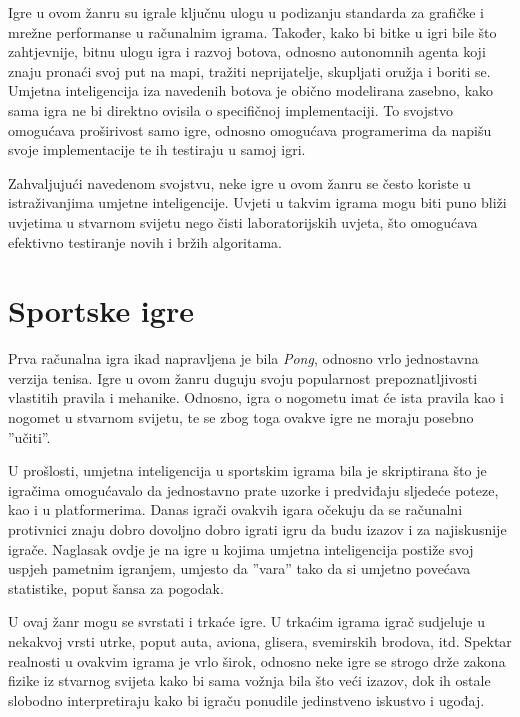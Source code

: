 \documentclass[times, utf8, zavrsni, numeric]{fer}
\begin{document}
\par Igre u ovom žanru su igrale ključnu ulogu u podizanju standarda za grafičke i mrežne performanse u računalnim igrama.
Također, kako bi bitke u igri bile što zahtjevnije, bitnu ulogu igra i razvoj botova, odnosno autonomnih agenta koji znaju pronaći svoj put na mapi, tražiti neprijatelje, skupljati oružja i boriti se.
Umjetna inteligencija iza navedenih botova je obično modelirana zasebno, kako sama igra ne bi direktno ovisila o specifičnoj implementaciji.
To svojstvo omogućava proširivost samo igre, odnosno omogućava programerima da napišu svoje implementacije te ih testiraju u samoj igri.

\par Zahvaljujući navedenom svojstvu, neke igre u ovom žanru se često koriste u istraživanjima umjetne inteligencije.
Uvjeti u takvim igrama mogu biti puno bliži uvjetima u stvarnom svijetu nego čisti laboratorijskih uvjeta, što omogućava efektivno testiranje novih i bržih algoritama.

\section{Sportske igre}

\par Prva računalna igra ikad napravljena je bila \textit{Pong}, odnosno vrlo jednostavna verzija tenisa.
Igre u ovom žanru duguju svoju popularnost prepoznatljivosti vlastitih pravila i mehanike.
Odnosno, igra o nogometu imat će ista pravila kao i nogomet u stvarnom svijetu, te se zbog toga ovakve igre ne moraju posebno ''učiti''.

\par U prošlosti, umjetna inteligencija u sportskim igrama bila je skriptirana što je igračima omogućavalo da jednostavno prate uzorke i predviđaju sljedeće poteze, kao i u platformerima.
Danas igrači ovakvih igara očekuju da se računalni protivnici znaju dobro dovoljno dobro igrati igru da budu izazov i za najiskusnije igrače.
Naglasak ovdje je na igre u kojima umjetna inteligencija postiže svoj uspjeh pametnim igranjem, umjesto da ''vara'' tako da si umjetno povećava statistike, poput šansa za pogodak.

\par U ovaj žanr mogu se svrstati i trkaće igre.
U trkaćim igrama igrač sudjeluje u nekakvoj vrsti utrke, poput auta, aviona, glisera, svemirskih brodova, itd.
Spektar realnosti u ovakvim igrama je vrlo širok, odnosno neke igre se strogo drže zakona fizike iz stvarnog svijeta kako bi sama vožnja bila što veći izazov, dok ih ostale slobodno interpretiraju kako bi igraču ponudile jedinstveno iskustvo i ugođaj.
\end{document}
